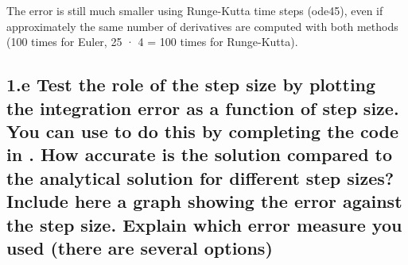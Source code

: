 \documentclass{cmc}
\begin{document}
The error is still much smaller using Runge-Kutta time steps (ode45), even if approximately the same number of derivatives are computed with both methods (100 times for Euler, 25 · 4 = 100 times for Runge-Kutta).

\subsection*{1.e Test the role of the step size by plotting the integration
  error as a function of step size. You can use
  to do this by completing the code in
  . %
  How accurate is the solution compared to the analytical solution for different
  step sizes?  Include here a graph showing the error against the step
  size. Explain which error measure you used (there are several options)}
\end{document}
